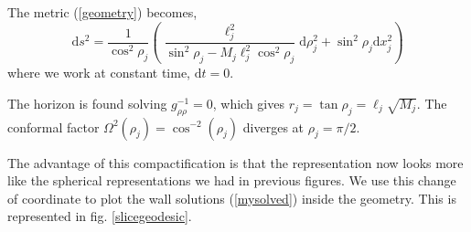 The metric (\ref{geometry}) becomes,
\begin{equation}
    \text{d}s^2 = \frac{1}{\cos^2{\rho_j}}\left( \frac{\ell_j^2}{\sin^2{\rho_j}-M_j\ell_j^2\cos^2{\rho_j}}\text{d}\rho_j^2+\sin^2{\rho_j}\text{d}x_j^2\right)
\end{equation}
where we work at constant time, $\text{d}t=0$.

The horizon is found solving $g_{\rho\rho}^{-1}=0$, which gives $r_j = \tan\rho_j=\ell_j\sqrt{M_j}$. The conformal factor $\Omega^2(\rho_j)=\cos^{-2}(\rho_j)$ diverges at $\rho_j=\pi/2$.

The advantage of this compactification is that the representation now looks more like the spherical representations we had in previous figures. We use this change of coordinate to plot the wall solutions (\ref{mysolved}) inside the geometry. This is represented in fig. \ref{slicegeodesic}.
